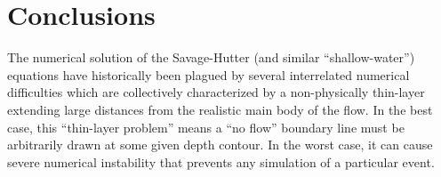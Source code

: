 \documentclass[letterpaper,10pt]{article}
\begin{document}
%
%
% 
% 



\section{Conclusions} \label{conclusions}
The numerical solution of the Savage-Hutter (and similar 
``shallow-water'') equations have historically been plagued by 
several interrelated numerical difficulties which are collectively characterized by a non-physically thin-layer extending large distances from the realistic main body of the flow. 
In the best case, this ``thin-layer problem'' means a ``no flow'' boundary line must be arbitrarily drawn at some given depth contour.  In 
the worst case, it can cause severe numerical instability that 
prevents any simulation of a particular event.
\end{document}
